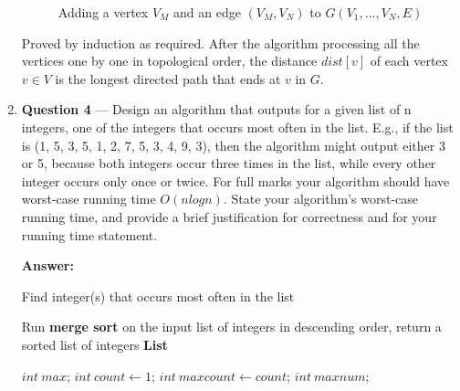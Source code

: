 \documentclass[11pt]{article}
\theoremstyle{definition}
\begin{document}
\begin{enumerate}
\begin{figure}[htbp]
\centering
{}
\caption{\label{fig: } Adding a vertex $V_M$ and an edge $(V_M,V_N)$ to $G(V_1,...,V_N, E)$}
\end{figure}

Proved by induction as required. After the algorithm processing all the vertices one by one in topological order, the distance $dist[v]$ of each vertex $v \in V$ is the longest directed path that ends at $v$ in $G$.


\newpage

\item[] \textbf{Question 4} --- Design an algorithm that outputs for a given list of n integers, one of the integers that occurs most often in the list. E.g., if the list is (1, 5, 3, 5, 1, 2, 7, 5, 3, 4, 9, 3), then the algorithm might output either 3 or 5, because both integers occur three times in the list, while every other integer occurs only once or twice. For full marks your algorithm should have worst-case running time $O(n log n)$. State your algorithm’s worst-case running time, and provide a brief justification for correctness and for your running time statement.

\textbf{Answer:}

\begin{algorithm}[H]
\caption{Find integer(s) that occurs most often in the list}%
\LinesNumbered %
Run \textbf{merge sort} on the input list of integers in descending order, return a sorted list of integers \textbf{List}\; %

$int\ max$; 
$int\ count \gets 1$; 
$int\ maxcount \gets count$; 
$int\ maxnum$; 


\end{algorithm}
\end{enumerate}
\end{document}
